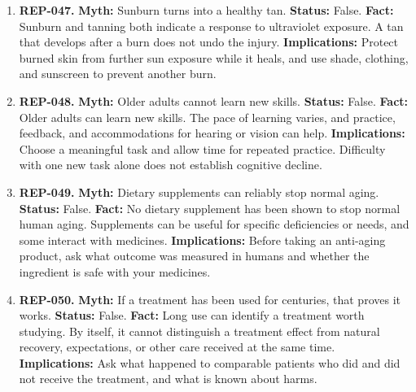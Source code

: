 \documentclass[11pt,oneside]{book}
\begin{document}
\begin{enumerate}[leftmargin=0pt,labelwidth=0pt,labelsep=0pt,itemindent=0pt]
\textbf{Implications:} Seek assessment for a changing spot, a new or widening dark nail streak, or a sore that fails to heal.
\item[] \textbf{REP-047.} \textbf{Myth:} Sunburn turns into a healthy tan.\newline
\textbf{Status:} False.\newline
\textbf{Fact:} Sunburn and tanning both indicate a response to ultraviolet exposure. A tan that develops after a burn does not undo the injury. \cite{ref319}\newline
\textbf{Implications:} Protect burned skin from further sun exposure while it heals, and use shade, clothing, and sunscreen to prevent another burn.
\item[] \textbf{REP-048.} \textbf{Myth:} Older adults cannot learn new skills.\newline
\textbf{Status:} False.\newline
\textbf{Fact:} Older adults can learn new skills. The pace of learning varies, and practice, feedback, and accommodations for hearing or vision can help. \cite{ref341}\newline
\textbf{Implications:} Choose a meaningful task and allow time for repeated practice. Difficulty with one new task alone does not establish cognitive decline.
\item[] \textbf{REP-049.} \textbf{Myth:} Dietary supplements can reliably stop normal aging.\newline
\textbf{Status:} False.\newline
\textbf{Fact:} No dietary supplement has been shown to stop normal human aging. Supplements can be useful for specific deficiencies or needs, and some interact with medicines. \cite{ref342}\newline
\textbf{Implications:} Before taking an anti-aging product, ask what outcome was measured in humans and whether the ingredient is safe with your medicines.
\item[] \textbf{REP-050.} \textbf{Myth:} If a treatment has been used for centuries, that proves it works.\newline
\textbf{Status:} False.\newline
\textbf{Fact:} Long use can identify a treatment worth studying. By itself, it cannot distinguish a treatment effect from natural recovery, expectations, or other care received at the same time. \cite{ref205}\newline
\textbf{Implications:} Ask what happened to comparable patients who did and did not receive the treatment, and what is known about harms.


\end{enumerate}
\end{document}

